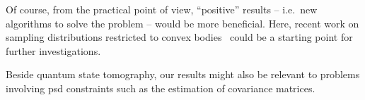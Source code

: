 Of course, from the practical point of view, ``positive'' results -- i.e.\ new algorithms to solve the problem -- would be more beneficial.
Here, recent work on sampling distributions restricted to convex bodies~\cite{Cousins_2013_Cubic,Cousins_2015_Bypassing} could be a starting point for further investigations.

Beside quantum state tomography, our results might also be relevant to problems involving psd constraints such as the estimation of covariance matrices.

